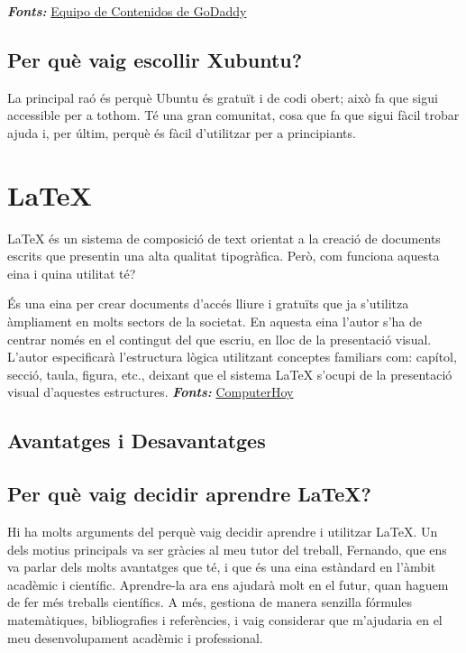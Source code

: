 \textit{\textbf{Fonts:}} \href{https://www.godaddy.com/resources/es/crearweb/que-es-ubuntu-y-para-que-sirve}{Equipo de Contenidos de GoDaddy}

\subsection{Per què vaig escollir Xubuntu?}
La principal raó és perquè Ubuntu és gratuït i de codi obert; això fa que sigui accessible per a tothom. Té una gran comunitat, cosa que fa que sigui fàcil trobar ajuda i, per últim, perquè és fàcil d’utilitzar per a principiants.

\section{LaTeX} \label{sec:latex}
LaTeX \cite{LaTeX} és un sistema de composició de text orientat a la creació de documents escrits que presentin una alta qualitat tipogràfica. Però, com funciona aquesta eina i quina utilitat té?

És una eina per crear documents d’accés lliure i gratuïts que ja s’utilitza àmpliament en molts sectors de la societat. En aquesta eina l’autor s’ha de centrar només en el contingut del que escriu, en lloc de la presentació visual. L’autor especificarà l’estructura lògica utilitzant conceptes familiars com: capítol, secció, taula, figura, etc., deixant que el sistema LaTeX s’ocupi de la presentació visual d’aquestes estructures.
\textit{\textbf{Fonts:}} \href{https://computerhoy.20minutos.es/tecnologia/latex-como-funciona-util-herramienta-crear-documentos-1165366#3-1670263544507}{ComputerHoy}\\
\subsection{Avantatges i Desavantatges}
\subsection{Per què vaig decidir aprendre LaTeX?}
Hi ha molts arguments del perquè vaig decidir aprendre i utilitzar LaTeX. Un dels motius principals va ser gràcies al meu tutor del treball, Fernando, que ens va parlar dels molts avantatges que té, i que és una eina estàndard en l’àmbit acadèmic i científic. Aprendre-la ara ens ajudarà molt en el futur, quan haguem de fer més treballs científics. A més, gestiona de manera senzilla fórmules matemàtiques, bibliografies i referències, i vaig considerar que m’ajudaria en el meu desenvolupament acadèmic i professional.\\

